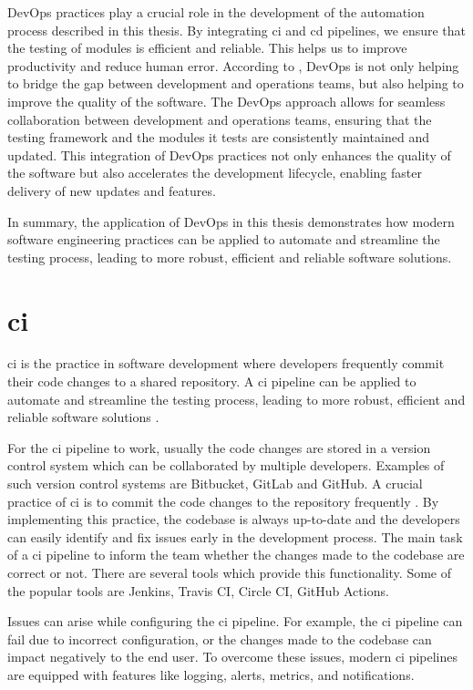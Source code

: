 DevOps practices play a crucial role in the development of the automation process described in this thesis. By integrating \acrfull{ci} and \acrfull{cd} pipelines, we ensure that the testing of 
modules is efficient and reliable. This helps us to improve productivity and reduce human error. According to \cite{8257807}, DevOps is not only helping to bridge
the gap between development and operations teams, but also helping to improve the quality of the software.
The DevOps approach allows for seamless collaboration between development and operations teams, 
ensuring that the testing framework and the modules it tests are consistently maintained and updated. This integration of DevOps practices not only enhances the quality of the software but also 
accelerates the development lifecycle, enabling faster delivery of new updates and features.\newline

In summary, the application of DevOps in this thesis demonstrates how modern software engineering practices can be applied to automate and streamline the testing process, leading to more robust,
efficient and reliable software solutions.

\section{\acrlong{ci}}
    \acrfull{ci} is the practice in software development where developers frequently commit their code changes to a shared repository. A \acrshort{ci} pipeline 
    can be applied to automate and streamline the testing process, leading to more robust, efficient and reliable software solutions \cite{8421965}.

    For the \acrshort{ci} pipeline to work, usually the code changes are stored in a version control system which can be collaborated by multiple developers.
    Examples of such version control systems are Bitbucket, GitLab and GitHub. A crucial practice of \acrshort{ci} is to commit the code changes to the repository 
    frequently \cite{6802994}. By implementing this practice, the codebase is always up-to-date and the developers can easily identify and fix issues early in 
    the development process. The main task of a \acrshort{ci} pipeline to inform the team whether the changes made to the codebase are correct or not. There are 
    several tools which provide this functionality. Some of the popular tools are Jenkins, Travis CI, Circle CI, GitHub Actions. 

    Issues can arise while configuring the \acrshort{ci} pipeline. For example, the \acrshort{ci} pipeline can fail due to 
    incorrect configuration, or the changes made to the codebase can impact negatively to the end user. To overcome these issues, modern \acrshort{ci} pipelines are 
    equipped with features like logging, alerts, metrics, and notifications.

